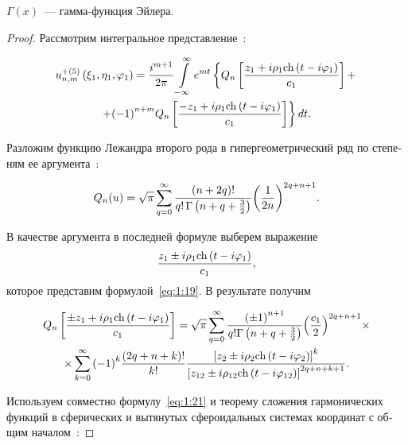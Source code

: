 \begin{russian}
\begin{theorem}
$\Gamma (x)$~--- гамма-функция Эйлера.
\end{theorem}

\begin{proof}
Рассмотрим интегральное представление~\cite{Nikolaev1998-1}:

\begin{multline}\label{eq:1:27}
u_{n,m}^{ + (5)}\left( {{\xi _1},{\eta _1},{\varphi _1}} \right) = \frac{{{i^{m + 1}}}}{{2\pi }}\int\limits_{ - \infty }^\infty  {{e^{mt}}} \left\{ {{Q_n}\left[ {\frac{{{z_1} + i{\rho _1}{\mathop{\rm ch}\nolimits} \left( {t - i{\varphi _1}} \right)}}{{{c_1}}}} \right] + } \right. \\
\left. { + {{( - 1)}^{n + m}}{Q_n}\left[ {\frac{{ - {z_1} + i{\rho _1}{\mathop{\rm ch}\nolimits} \left( {t - i{\varphi _1}} \right)}}{{{c_1}}}} \right]} \right\}dt.
\end{multline}

Разложим функцию Лежандра второго рода в гипергеометрический ряд по степеням ее аргумента~\cite{Lebedev}:

\begin{equation}\label{eq:1:28}
{Q_n}(u) = \sqrt \pi  \sum\limits_{q = 0}^\infty  {\frac{{(n + 2q)!}}{{q!{\mkern 1mu} {\kern 1pt} \Gamma \left( {n + q + \frac{3}{2}} \right)}}} {\left( {\frac{1}{{2n}}} \right)^{2q + n + 1}}.
\end{equation}

В качестве аргумента в последней формуле выберем выражение $$\dfrac{{{z_1} \pm i{\rho _1}{\mathop{\rm ch}\nolimits} \left( {t - i{\varphi _1}} \right)}}{{{c_1}}},$$ которое представим формулой~\eqref{eq:1:19}. В результате получим

\begin{multline}\label{eq:1:29}
{Q_n}\left[ {\frac{{ \pm {z_1} + i{\rho _1}{\mathop{\rm ch}\nolimits} \left( {t - i{\varphi _1}} \right)}}{{{c_1}}}} \right] = \sqrt \pi  \sum\limits_{q = 0}^\infty  {\frac{{{{( \pm 1)}^{n + 1}}}}{{q!\Gamma \left( {n + q + \frac{3}{2}} \right)}}} {\left( {\frac{{{c_1}}}{2}} \right)^{2q + n + 1}} \times \\
\times \sum\limits_{k = 0}^\infty  {{{( - 1)}^k}} \frac{{(2q + n + k)!}}{{k!}}\frac{{{{\left[ {{z_2} \pm i{\rho _2}{\mathop{\rm ch}\nolimits} \left( {t - i{\varphi _2}} \right)} \right]}^k}}}{{{{\left[ {{z_{12}} \pm i{\rho _{12}}{\mathop{\rm ch}\nolimits} \left( {t - i{\varphi _{12}}} \right)} \right]}^{2q + n + k + 1}}}}.
\end{multline}

Используем совместно формулу~\eqref{eq:1:21} и теорему сложения гармонических функций в сферических и вытянутых сфероидальных системах координат с общим началом~\cite{Nikolaev2011}:


\end{proof}
\end{russian}
